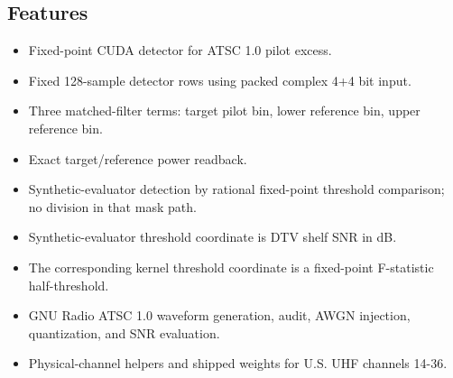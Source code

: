 \documentclass[10pt,letterpaper]{article}
\newcommand{\code}[1]{\texttt{\detokenize{#1}}}
\begin{document}
\begin{minipage}[t]{0.48\textwidth}
\subsection*{Features}
\begin{itemize}
  \item Fixed-point CUDA detector for ATSC 1.0 pilot excess.
  \item Fixed 128-sample detector rows using packed complex 4+4 bit input.
  \item Three matched-filter terms: target pilot bin, lower reference bin, upper reference bin.
  \item Exact \code{uint64} target/reference power readback.
  \item Synthetic-evaluator detection by rational fixed-point threshold comparison; no division in that mask path.
  \item Synthetic-evaluator threshold coordinate is DTV shelf SNR in dB.
  \item The corresponding kernel threshold coordinate is a fixed-point F-statistic half-threshold.
  \item GNU Radio ATSC 1.0 waveform generation, audit, AWGN injection, quantization, and SNR evaluation.
  \item Physical-channel helpers and shipped weights for U.S. UHF channels 14-36.
\end{itemize}
\end{minipage}
\hfill
\end{document}
